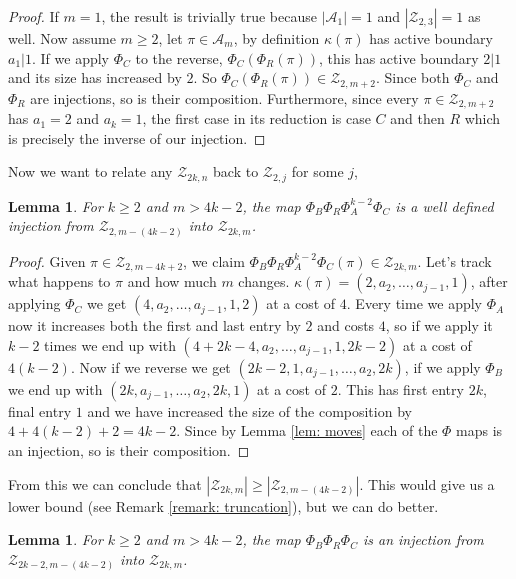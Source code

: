 \documentclass[11pt]{article}
\newcommand\A{\mathcal A}
\newcommand\cZ{\mathcal Z}
\newtheorem{lemma}[theorem]{Lemma}
\theoremstyle{definition}
\begin{document}
\begin{proof}
    If $m = 1$, the result is trivially true because $|\A_1| = 1$ and $|\cZ_{2,3}| = 1$ as well. Now assume $m \ge 2$, let $\pi \in \A_{m}$, by definition $\kappa(\pi)$ has active boundary $a_1|1$. If we apply $\Phi_C$ to the reverse, $\Phi_C(\Phi_R(\pi))$, this has active boundary $2|1$ and its size has increased by $2$. So $\Phi_C(\Phi_R(\pi)) \in \cZ_{2,m+2}$. Since both $\Phi_C$ and $\Phi_R$ are injections, so is their composition. Furthermore, since every $\pi \in \cZ_{2,m+2}$ has $a_1 = 2$ and $a_k = 1$, the first case in its reduction is case $C$ and then $R$ which is precisely the inverse of our injection.
\end{proof}

Now we want to relate any $\cZ_{2k,n}$ back to $\cZ_{2,j}$ for some $j$,

\begin{lemma}\label{lem: INJ-1}
    For $k \ge 2$ and $m > 4k-2$, the map $\Phi_{B}\Phi_R\Phi_A^{k-2}\Phi_C$ is a well defined injection from $\cZ_{2,m-(4k-2)}$ into $\cZ_{2k,m}$.
\end{lemma}

\begin{proof}
    Given $\pi \in \cZ_{2,m-4k+2}$, we claim $\Phi_B\Phi_R\Phi_A^{k-2}\Phi_C(\pi) \in \cZ_{2k,m}$. Let's track what happens to $\pi$ and how much $m$ changes. $\kappa(\pi) = (2,a_2,\dots,a_{j-1},1)$, after applying $\Phi_C$ we get $(4,a_2,\dots,a_{j-1},1,2)$ at a cost of $4$. Every time we apply $\Phi_A$ now it increases both the first and last entry by $2$ and costs $4$, so if we apply it $k-2$ times we end up with $(4+2k-4,a_2,\dots,a_{j-1},1,2k-2)$ at a cost of $4(k-2)$. Now if we reverse we get $(2k-2,1,a_{j-1},\dots,a_2,2k)$, if we apply $\Phi_B$ we end up with $(2k,a_{j-1},\dots,a_2,2k,1)$ at a cost of $2$. This has first entry $2k$, final entry $1$ and we have increased the size of the composition by $4 + 4(k-2) + 2 = 4k-2$. Since by Lemma \ref{lem: moves} each of the $\Phi$ maps is an injection, so is their composition.
\end{proof}

From this we can conclude that $|\cZ_{2k,m}| \ge |\cZ_{2,m-(4k-2)}|$. This would give us a lower bound (see Remark \ref{remark: truncation}), but we can do better.

\begin{lemma}\label{lem: INJ-2}
    For $k \ge 2$ and $m > 4k-2$, the map $\Phi_B \Phi_R \Phi_C$ is an injection from $\cZ_{2k-2,m-(4k-2)}$ into $\cZ_{2k,m}$.
\end{lemma}
\end{document}
